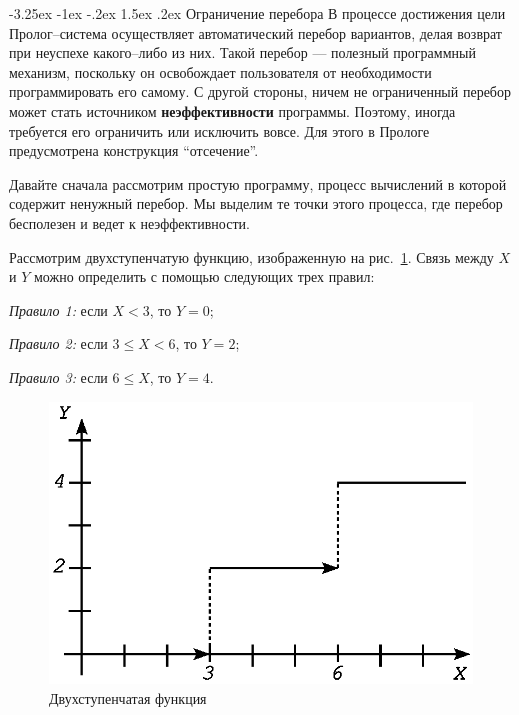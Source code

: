 \documentclass[12pt, openany, twoside]{book} %
\makeatletter
\renewcommand\section{\@startsection {section}{1}{\z@}%
                                   {-3.25ex \@plus -1ex \@minus -.2ex}%
                                   {1.5ex \@plus.2ex}%
                                   {\normalfont\large\bfseries}}
\makeatother
\begin{document}
\section{Ограничение перебора}
В процессе достижения цели Пролог--система осуществляет автоматический перебор вариантов, делая возврат при неуспехе какого--либо из них. Такой перебор --- полезный программный механизм, поскольку он освобождает пользователя от необходимости программировать его самому. С другой стороны, ничем не ограниченный перебор может стать источником {\bf неэффективности} программы. Поэтому, иногда требуется его ограничить или исключить вовсе. Для этого в Прологе предусмотрена конструкция ``отсечение''.

Давайте сначала рассмотрим простую программу, процесс вычислений в которой содержит ненужный перебор. Мы выделим те точки этого процесса, где перебор бесполезен и ведет к неэффективности.

Рассмотрим двухступенчатую функцию, изображенную на рис.~\ref{pic:func_step}. Связь между $X$ и $Y$ можно определить с помощью следующих трех правил:

\emph{Правило 1:} если $X < 3$, то $Y = 0$;

\emph{Правило 2:} если $3 \leq X < 6$, то $Y = 2$;

\emph{Правило 3:} если $6 \leq X$, то $Y = 4$.

\begin{figure}[ht]
\begin{center}
\includegraphics[scale=0.7]{pics/func_step.eps}
\end{center}
\caption{Двухступенчатая функция} \label{pic:func_step}
\end{figure}
\end{document}

